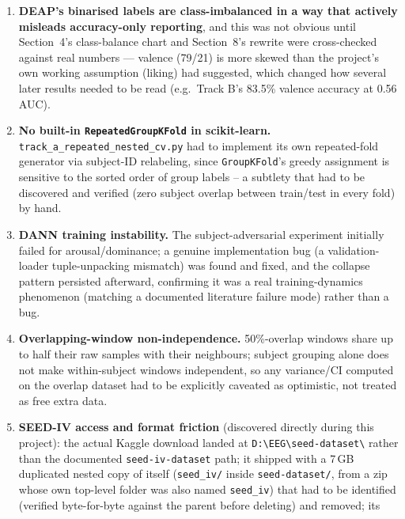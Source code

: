 \documentclass[11pt]{report}
\begin{document}
\begin{enumerate}
  \item \textbf{DEAP's binarised labels are class-imbalanced in a way that
        actively misleads accuracy-only reporting}, and this was not obvious
        until Section~4's class-balance chart and Section~8's rewrite were
        cross-checked against real numbers --- valence (79/21) is more
        skewed than the project's own working assumption (liking) had
        suggested, which changed how several later results needed to be
        read (e.g.\ Track B's 83.5\% valence accuracy at 0.56 AUC).
  \item \textbf{No built-in \texttt{RepeatedGroupKFold} in scikit-learn.}
        \texttt{track\_a\_repeated\_nested\_cv.py} had to implement its own
        repeated-fold generator via subject-ID relabeling, since
        \texttt{GroupKFold}'s greedy assignment is sensitive to the sorted
        order of group labels -- a subtlety that had to be discovered and
        verified (zero subject overlap between train/test in every fold) by
        hand.
  \item \textbf{DANN training instability.} The subject-adversarial
        experiment initially failed for arousal/dominance; a genuine
        implementation bug (a validation-loader tuple-unpacking mismatch)
        was found and fixed, and the collapse pattern persisted afterward,
        confirming it was a real training-dynamics phenomenon (matching a
        documented literature failure mode) rather than a bug.
  \item \textbf{Overlapping-window non-independence.} 50\%-overlap windows
        share up to half their raw samples with their neighbours; subject
        grouping alone does not make within-subject windows independent,
        so any variance/CI computed on the overlap dataset had to be
        explicitly caveated as optimistic, not treated as free extra data.
  \item \textbf{SEED-IV access and format friction} (discovered directly
        during this project): the actual Kaggle download landed at
        \texttt{D:\textbackslash EEG\textbackslash seed-dataset\textbackslash} rather
        than the documented \texttt{seed-iv-dataset} path; it shipped with
        a 7\,GB duplicated nested copy of itself (\texttt{seed\_iv/} inside
        \texttt{seed-dataset/}, from a zip whose own top-level folder was
        also named \texttt{seed\_iv}) that had to be identified (verified
        byte-for-byte against the parent before deleting) and removed; its

\end{enumerate}
\end{document}
